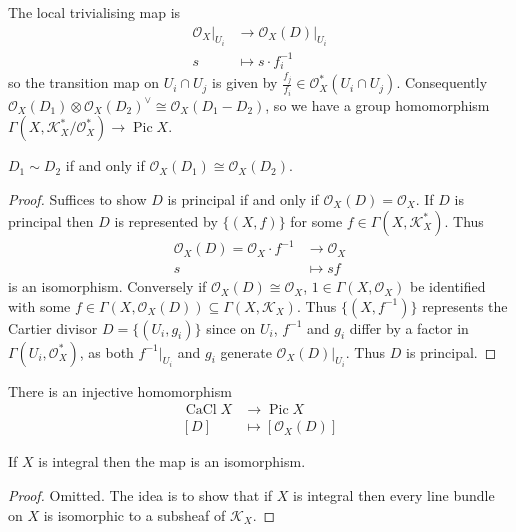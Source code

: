 \documentclass[a4paper]{article}
\newcommand{\sh}[1]{\mathcal{#1}} %
\DeclareMathOperator{\Pic}{Pic} %
\DeclareMathOperator{\CaCl}{CaCl} %
\begin{document}
\begin{remark}
  The local trivialising map is
  \begin{align*}
    \sh O_X|_{U_i} &\to \sh O_X(D)|_{U_i} \\
    s &\mapsto s \cdot f_i^{-1}
  \end{align*}
  so the transition map on \(U_i \cap U_j\) is given by \(\frac{f_j}{f_i} \in \sh O_X^*(U_i \cap U_j)\). Consequently \(\sh O_X(D_1) \otimes \sh O_X(D_2)^\vee \cong \sh O_X(D_1 - D_2)\), so we have a group homomorphism \(\Gamma(X, \sh K_X^*/\sh O_X^*) \to \Pic X\).
\end{remark}

\begin{lemma}
  \(D_1 \sim D_2\) if and only if \(\sh O_X(D_1) \cong \sh O_X(D_2)\).
\end{lemma}

\begin{proof}
  Suffices to show \(D\) is principal if and only if \(\sh O_X(D) = \sh O_X\). If \(D\) is principal then \(D\) is represented by \(\{(X, f)\}\) for some \(f \in \Gamma(X, \sh K_X^*)\). Thus
  \begin{align*}
    \sh O_X(D) = \sh O_X \cdot f^{-1} &\to \sh O_X \\
    s &\mapsto sf
  \end{align*}
  is an isomorphism. Conversely if \(\sh O_X(D) \cong \sh O_X\), \(1 \in \Gamma(X, \sh O_X)\) be identified with some \(f \in \Gamma(X, \sh O_X(D)) \subseteq \Gamma(X, \sh K_X)\). Thus \(\{(X, f^{-1})\}\) represents the Cartier divisor \(D = \{(U_i, g_i)\}\) since on \(U_i\), \(f^{-1}\) and \(g_i\) differ by a factor in \(\Gamma(U_i, \sh O_X^*)\), as both \(f^{-1}|_{U_i}\) and \(g_i\) generate \(\sh O_X(D)|_{U_i}\). Thus \(D\) is principal.
\end{proof}

\begin{corollary}
  There is an injective homomorphism
  \begin{align*}
    \CaCl X &\to \Pic X \\
    [D] &\mapsto [\sh O_X(D)]
  \end{align*}
\end{corollary}

\begin{proposition}
  If \(X\) is integral then the map is an isomorphism.
\end{proposition}

\begin{proof}
  Omitted. The idea is to show that if \(X\) is integral then every line bundle on \(X\) is isomorphic to a subsheaf of \(\sh K_X\).
\end{proof}
\end{document}
